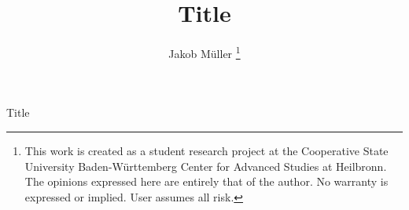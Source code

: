 \documentclass[lettersize,journal]{IEEEtran}
\begin{document}







\title{Title}

\author{Jakob Müller
\thanks{This work is created as a student research project at the Cooperative State University Baden-Württemberg Center for Advanced Studies at Heilbronn. The opinions expressed here are entirely that of the author. No warranty is expressed or implied. User assumes all risk.}}
%
{Title}
\end{document}
